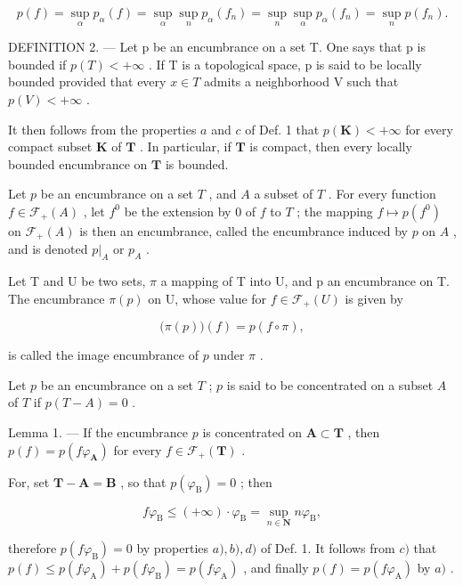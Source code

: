 \[
p (f) = \sup _ {\alpha} p _ {\alpha} (f) = \sup _ {\alpha} \sup _ {n} p _ {\alpha} (f _ {n}) = \sup _ {n} \sup _ {\alpha} p _ {\alpha} (f _ {n}) = \sup _ {n} p (f _ {n}).
\]

DEFINITION 2. --- Let p be an encumbrance on a set T. One says that p is bounded if \(p(T) < +\infty\) . If T is a topological space, p is said to be locally bounded provided that every \(x \in T\) admits a neighborhood V such that \(p(V) < +\infty\) .

It then follows from the properties \(a\) and \(c\) of Def. 1 that \(p(\mathbf{K}) < +\infty\) for every compact subset \(\mathbf{K}\) of \(\mathbf{T}\) . In particular, if \(\mathbf{T}\) is compact, then every locally bounded encumbrance on \(\mathbf{T}\) is bounded.

Let \(p\) be an encumbrance on a set \(T\) , and \(A\) a subset of \(T\) . For every function \(f \in \mathcal{F}_{+}(A)\) , let \(f^0\) be the extension by 0 of \(f\) to \(T\) ; the mapping \(f \mapsto p(f^0)\) on \(\mathcal{F}_{+}(A)\) is then an encumbrance, called the encumbrance induced by \(p\) on \(A\) , and is denoted \(p|_{A}\) or \(p_A\) .

Let T and U be two sets, \(\pi\) a mapping of T into U, and p an encumbrance on T. The encumbrance \(\pi(p)\) on U, whose value for \(f \in \mathcal{F}_{+}(U)\) is given by

\[
\bigl (\pi (p) \bigr) (f) = p (f \circ \pi),
\]

is called the image encumbrance of \(p\) under \(\pi\) .

Let \(p\) be an encumbrance on a set \(T\) ; \(p\) is said to be concentrated on a subset \(A\) of \(T\) if \(p(T - A) = 0\) .

Lemma 1. --- If the encumbrance \(p\) is concentrated on \(\mathbf{A} \subset \mathbf{T}\) , then \(p(f) = p(f\varphi_{\mathbf{A}})\) for every \(f \in \mathcal{F}_{+}(\mathbf{T})\) .

For, set \(\mathbf{T} - \mathbf{A} = \mathbf{B}\) , so that \(p(\varphi_{\mathrm{B}}) = 0\) ; then

\[
f \varphi_ {\mathrm{B}} \leqslant (+ \infty) \cdot \varphi_ {\mathrm{B}} = \sup _ {n \in \mathbf {N}} n \varphi_ {\mathrm{B}},
\]

therefore \(p(f\varphi_{\mathrm{B}}) = 0\) by properties \(a), b), d)\) of Def. 1. It follows from \(c)\) that \(p(f) \leqslant p(f\varphi_{\mathrm{A}}) + p(f\varphi_{\mathrm{B}}) = p(f\varphi_{\mathrm{A}})\) , and finally \(p(f) = p(f\varphi_{\mathrm{A}})\) by \(a)\) .

